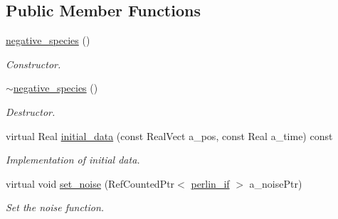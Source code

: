 \subsection*{Public Member Functions}
\begin{DoxyCompactItemize}
\item 
\hyperlink{classair__bolsig_1_1negative__species_aaa47ac55634e85e1f21bae4b635b8946}{negative\+\_\+species} ()
\begin{DoxyCompactList}\small\item\em Constructor. \end{DoxyCompactList}\item 
\hyperlink{classair__bolsig_1_1negative__species_abc10d268ca3dcc859d037b1c676c6592}{$\sim$negative\+\_\+species} ()
\begin{DoxyCompactList}\small\item\em Destructor. \end{DoxyCompactList}\item 
virtual Real \hyperlink{classair__bolsig_1_1negative__species_a609f505dd536dfb73ce66f5793fea8bc}{initial\+\_\+data} (const Real\+Vect a\+\_\+pos, const Real a\+\_\+time) const 
\begin{DoxyCompactList}\small\item\em Implementation of initial data. \end{DoxyCompactList}\item 
virtual void \hyperlink{classair__bolsig_1_1negative__species_a6b7641c7841608031fa6415cb1edf668}{set\+\_\+noise} (Ref\+Counted\+Ptr$<$ \hyperlink{classperlin__if}{perlin\+\_\+if} $>$ a\+\_\+noise\+Ptr)
\begin{DoxyCompactList}\small\item\em Set the noise function. \end{DoxyCompactList}\end{DoxyCompactItemize}
